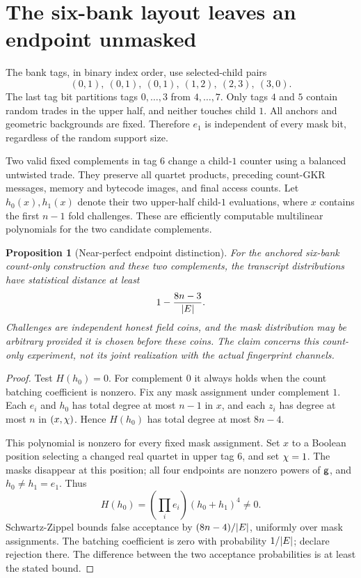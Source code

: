 \documentclass[11pt]{article}
\newtheorem{proposition}{Proposition}
\begin{document}
\section{The six-bank layout leaves an endpoint unmasked}

The bank tags, in binary index order, use selected-child pairs
\[
 (0,1),\ (0,1),\ (0,1),\ (1,2),\ (2,3),\ (3,0).
\]
The last tag bit partitions tags $0,\ldots,3$ from $4,\ldots,7$. Only tags $4$ and $5$ contain random trades in the upper half, and neither touches child $1$. All anchors and geometric backgrounds are fixed. Therefore $e_1$ is independent of every mask bit, regardless of the random support size.

Two valid fixed complements in tag $6$ change a child-$1$ counter using a balanced untwisted trade. They preserve all quartet products, preceding count-GKR messages, memory and bytecode images, and final access counts. Let $h_0(x),h_1(x)$ denote their two upper-half child-$1$ evaluations, where $x$ contains the first $n-1$ fold challenges. These are efficiently computable multilinear polynomials for the two candidate complements.

\begin{proposition}[Near-perfect endpoint distinction]
For the anchored six-bank count-only construction and these two complements, the transcript distributions have statistical distance at least
\[
 1-\frac{8n-3}{|E|}.
\]
Challenges are independent honest field coins, and the mask distribution may be arbitrary provided it is chosen before these coins. The claim concerns this count-only experiment, not its joint realization with the actual fingerprint channels.
\end{proposition}
\begin{proof}
Test $H(h_0)=0$. For complement $0$ it always holds when the count batching coefficient is nonzero. Fix any mask assignment under complement $1$. Each $e_i$ and $h_0$ has total degree at most $n-1$ in $x$, and each $z_i$ has degree at most $n$ in $(x,\chi)$. Hence $H(h_0)$ has total degree at most $8n-4$.

This polynomial is nonzero for every fixed mask assignment. Set $x$ to a Boolean position selecting a changed real quartet in upper tag $6$, and set $\chi=1$. The masks disappear at this position; all four endpoints are nonzero powers of $\mathsf{g}$, and $h_0\ne h_1=e_1$. Thus
\[
 H(h_0)=\left(\prod_i e_i\right)(h_0+h_1)^4\ne0.
\]
Schwartz-Zippel bounds false acceptance by $(8n-4)/|E|$, uniformly over mask assignments. The batching coefficient is zero with probability $1/|E|$; declare rejection there. The difference between the two acceptance probabilities is at least the stated bound.
\end{proof}
\end{document}
